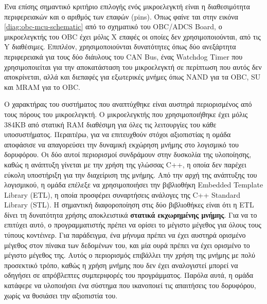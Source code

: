 \documentclass[a4paper,nobib,justified]{tufte-book}
\begin{document}
Ένα επίσης σημαντικό κριτήριο επιλογής ενός μικροελεγκτή είναι η διαθεσιμότητα περιφερειακών και ο αριθμός των επαφών (pins). Όπως φαίνε	ται στην εικόνα \ref*{diag:obc-mcu-schematic} από το σχηματικό του OBC/ADCS Board, ο μικροελεγκτής του OBC έχει μόλις X επαφές οι οποίες δεν χρησιμοποιούνται, από τις Y διαθέσιμες. Επιπλέον, χρησιμοποιούνται δυνατότητες όπως δύο ανεξάρτητα περιφερειακά για τους δύο διάυλους του CAN Bus, ένας Watchdog Timer που χρησιμοποιείται για την αποκατάσταση του μικροελεγκτή σε περίπτωση που αυτός δεν αποκρίνεται, αλλά και διεπαφές για εξωτερικές μνήμες όπως NAND για τα OBC, SU και MRAM για το OBC.  %


\clearpage


Ο χαρακτήρας του συστήματος που αναπτύχθηκε είναι αυστηρά περιορισμένος από τους πόρους του μικροελεγκτή. Ο μικροελεγκτής που χρησιμοποιήθηκε έχει μόλις 384KB από στατική RAM διαθέσιμη για όλες τις λειτουργίες του κάθε υποσυστήματος. Περαιτέρω, για να επιτευχθούν στόχοι αξιοπιστίας η ομάδα αποφάσισε να απαγορεύσει την δυναμική εκχώρηση μνήμης στο λογισμικό του δορυφόρου. Οι δύο αυτοί περιορισμοί συνδράμουν στην δυσκολία της υλοποίησης, καθώς η ανάπτυξη γίνεται με την χρήση της γλώσσας C++, η οποία δεν παρέχει εύκολη υποστήριξη για την διαχείριση της μνήμης. Από την αρχή της ανάπτυξης του λογισμικού, η ομάδα επέλεξε να χρησιμοποιήσει την βιβλιοθήκη Embedded Template Library (ETL), η οποία προσφέρει συναρτήσεις ανάλογες της C++ Standard Library (STL). Η σημαντική διαφοροποίηση στις δύο βιβλιοθήκες είναι ότι η ETL δίνει τη δυνατότητα χρήσης αποκλειστικά \textbf{στατικά εκχωρημένης μνήμης}. Για να το επιτύχει αυτό, ο προγραμματιστής πρέπει να ορίσει το μέγιστο μέγεθος για όλους τους τύπους κοντέινερ. Για παράδειγμα, ένα μήνυμα πρέπει να έχει αυστηρά ορισμένο μέγεθος στον πίνακα των δεδομένων του, και μία ουρά πρέπει να έχει ορισμένο το μέγιστο μέγεθος της. Αυτός ο περιορισμός επιβάλλει την χρήση της μνήμης με πολύ προσεκτικό τρόπο, καθώς η χρήση μνήμης που δεν έχει αναλογιστεί μπορεί να οδηγήσει σε απρόβλεπτες συμπεριφορές του προγράμματος. Παρόλα αυτά, η ομάδα κατάφερε να υλοποιήσει ένα σύστημα που ικανοποιεί τις απαιτήσεις του δορυφόρου, χωρίς να θυσιάσει την αξιοπιστία του.
\end{document}

